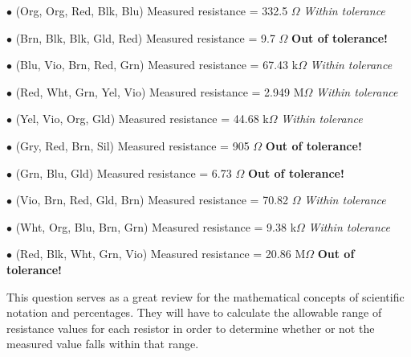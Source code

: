 \medskip
\item{$\bullet$} (Org, Org, Red, Blk, Blu) Measured resistance = 332.5 $\Omega$ {\it Within tolerance}
\item{$\bullet$} (Brn, Blk, Blk, Gld, Red) Measured resistance = 9.7 $\Omega$ {\bf Out of tolerance!}
\item{$\bullet$} (Blu, Vio, Brn, Red, Grn) Measured resistance = 67.43 k$\Omega$ {\it Within tolerance}
\item{$\bullet$} (Red, Wht, Grn, Yel, Vio) Measured resistance = 2.949 M$\Omega$ {\it Within tolerance}
\item{$\bullet$} (Yel, Vio, Org, Gld) Measured resistance = 44.68 k$\Omega$ {\it Within tolerance} 
\item{$\bullet$} (Gry, Red, Brn, Sil) Measured resistance = 905 $\Omega$ {\bf Out of tolerance!}
\item{$\bullet$} (Grn, Blu, Gld) Measured resistance = 6.73 $\Omega$ {\bf Out of tolerance!}
\item{$\bullet$} (Vio, Brn, Red, Gld, Brn) Measured resistance = 70.82 $\Omega$ {\it Within tolerance}
\item{$\bullet$} (Wht, Org, Blu, Brn, Grn) Measured resistance = 9.38 k$\Omega$ {\it Within tolerance}
\item{$\bullet$} (Red, Blk, Wht, Grn, Vio) Measured resistance = 20.86 M$\Omega$ {\bf Out of tolerance!}
\medskip







This question serves as a great review for the mathematical concepts of scientific notation and percentages.  They will have to calculate the allowable range of resistance values for each resistor in order to determine whether or not the measured value falls within that range.




